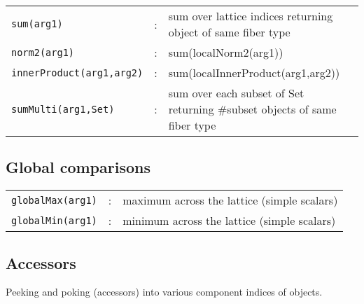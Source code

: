 \documentclass[12pt,letterpaper]{article}
\begin{document}
\begin{flushleft}
\begin{tabular}{lcp{4.0in}}
\verb|sum(arg1)|              &:& sum over lattice indices returning 
                                  object of same fiber type\\
\verb|norm2(arg1)|            &:& sum(localNorm2(arg1))\\
\verb|innerProduct(arg1,arg2)|&:& sum(localInnerProduct(arg1,arg2))\\
\verb|sumMulti(arg1,Set)|     &:& sum over each subset of Set returning \#subset
                                  objects of same fiber type\\
\end{tabular}
\end{flushleft}

\subsection{Global comparisons}
\label{sec:comparisons}

\begin{flushleft}
\begin{tabular}{lcp{4.0in}}
\verb|globalMax(arg1)|        &:& maximum across the lattice (simple scalars)\\
\verb|globalMin(arg1)|        &:& minimum across the lattice (simple scalars)\\
\end{tabular}
\end{flushleft}

\medskip

\subsection{Accessors}
\label{sec:peek}

Peeking and poking (accessors) into various component indices of objects.
\end{document}
